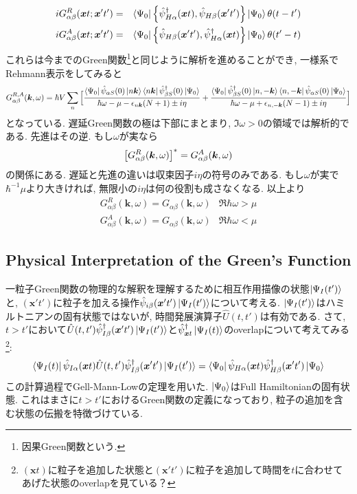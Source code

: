 \documentclass[10.5pt,a4paper]{jreport}
\newcommand{\bx}{\bm{x}}
\newcommand{\bk}{\bm{k}}
\newcommand{\hpsi}{\hat{\psi}}
\begin{document}
\begin{eqnarray}
  iG^R_{\alpha\beta}(\bx t;\bx't') &=& \bra{\Psi_0}\qty{\hpsi^\dagger_{H\alpha}(\bx t), \hpsi_{H\beta}(\bx't')}\ket{\Psi_0}\theta(t-t')\\
  iG^A_{\alpha\beta}(\bx t;\bx't') &=& \bra{\Psi_0}\qty{\hpsi_{H\beta}(\bx't'), \hpsi^\dagger_{H\alpha}(\bx t)}\ket{\Psi_0}\theta(t'-t)
\end{eqnarray}
これらは今までのGreen関数\footnote{因果Green関数という.}と同じように解析を進めることができ, 一様系でRehmann表示をしてみると
\begin{eqnarray}
  G_{\alpha\beta}^{R, A}(\bk, \omega) = \hbar V\sum_n\Big[\frac{\bra{\Psi_0}\hat{\psi}_{\alpha S}(0)\ket{n\bk}\bra{n\bk}\hat{\psi}^\dagger_{\beta S}(0)\ket{\Psi_0}}{\hbar\omega -\mu - \epsilon_{n\bk}\qty(N+1) \pm i\eta}+ \frac{\bra{\Psi_0}\hat{\psi}^\dagger_{\beta S}(0)\ket{n, -\bk}\bra{n, -\bk}\hat{\psi}_{\alpha S}(0)\ket{\Psi_0}}{\hbar\omega -\mu + \epsilon_{n,-\bk}\qty(N-1) \pm i\eta}\Big]\label{green-rehmann2}
\end{eqnarray}
となっている. 遅延Green関数の極は下部にまとまり, $\Im \omega > 0$の領域では解析的である. 先進はその逆. もし$\omega$が実なら
\begin{eqnarray}
  \qty[G_{\alpha\beta}^{R}(\bk, \omega)]^* = G_{\alpha\beta}^{A}(\bk, \omega)
\end{eqnarray}
の関係にある. 遅延と先進の違いは収束因子$i\eta$の符号のみである. もし$\omega$が実で$\hbar^{-1}\mu$より大きければ, 無限小の$i\eta$は何の役割も成さなくなる. 以上より
\begin{eqnarray}
  G_{\alpha\beta}^R(\bk, \omega) = G_{\alpha\beta}(\bk, \omega) & \Re\hbar\omega > \mu\\
  G_{\alpha\beta}^A(\bk, \omega) = G_{\alpha\beta}(\bk, \omega) & \Re\hbar\omega < \mu
\end{eqnarray}
\subsection{Physical Interpretation of the Green's Function}
一粒子Green関数の物理的な解釈を理解するために相互作用描像の状態$\ket{\Psi_I(t')}$と, $(\bx't')$に粒子を加える操作$\hpsi_{i\beta}(\bx't')\ket{\Psi_I(t')}$について考える. $\ket{\Psi_I(t')}$はハミルトニアンの固有状態ではないが, 時間発展演算子$\hat{U}(t, t')$は有効である. さて, $t>t'$において$\hat{U}(t, t')\hpsi_{I\beta}^\dagger(\bx't')\ket{\Psi_I(t')}$と$\hpsi^\dagger_{\bx t}\ket{\Psi_I(t)}$のoverlapについて考えてみる\footnote{$(\bx t)$に粒子を追加した状態と$(\bx't')$に粒子を追加して時間を$t$に合わせてあげた状態のoverlapを見ている？}:
\begin{eqnarray}
  \bra{\Psi_I(t)}\hpsi_{I\alpha}(\bx t)\hat{U}(t, t')\hpsi^\dagger_{I\beta}(\bx't')\ket{\Psi_I(t')} = \bra{\Psi_0}\hpsi_{H\alpha}(\bx t)\hpsi^\dagger_{H\beta}(\bx't')\ket{\Psi_0}
\end{eqnarray}
この計算過程でGell-Mann-Lowの定理を用いた. $\ket{\Psi_0}$はFull Hamiltonianの固有状態. これはまさに$t>t'$におけるGreen関数の定義になっており, 粒子の追加を含む状態の伝搬を特徴づけている.
\end{document}
